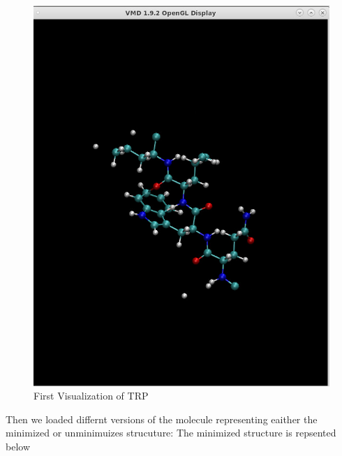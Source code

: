 \documentclass[11pt]{article}
\makeatletter
\def\maxwidth{\ifdim\Gin@nat@width>\linewidth\linewidth
    \else\Gin@nat@width\fi}
\let\Oldincludegraphics\includegraphics
\renewcommand{\includegraphics}[1]{\Oldincludegraphics[width=.8\maxwidth]{#1}}
\makeatother
\begin{document}
\begin{figure}
\centering
\includegraphics{Screenshot_first_fig_trp.png}
\caption{First Visualization of TRP}
\end{figure}

Then we loaded differnt versions of the molecule representing eaither
the minimized or unminimuizes strucuture: The minimized structure is
repsented below
\end{document}
